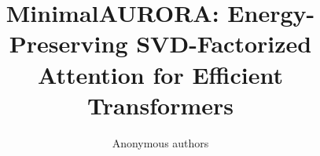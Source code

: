 \title{\textbf{MinimalAURORA: Energy-Preserving SVD-Factorized Attention for Efficient Transformers}}

\author{Anonymous authors}
